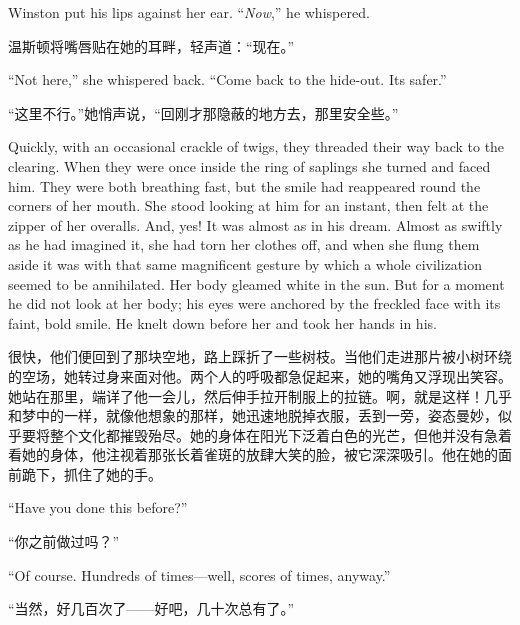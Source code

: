 \begin{paracol}{2}
\switchcolumn*

Winston put his lips against her ear. ``\emph{Now},'' he whispered.

\switchcolumn

温斯顿将嘴唇贴在她的耳畔，轻声道：``现在。''

\switchcolumn*

``Not here,'' she whispered back. ``Come back to the hide-out.
It\textquotesingle s safer.''

\switchcolumn

``这里不行。''她悄声说，``回刚才那隐蔽的地方去，那里安全些。''

\switchcolumn*

Quickly, with an occasional crackle of twigs, they threaded their way
back to the clearing. When they were once inside the ring of saplings
she turned and faced him. They were both breathing fast, but the smile
had reappeared round the corners of her mouth. She stood looking at him
for an instant, then felt at the zipper of her overalls. And, yes! It
was almost as in his dream. Almost as swiftly as he had imagined it, she
had torn her clothes off, and when she flung them aside it was with that
same magnificent gesture by which a whole civilization seemed to be
annihilated. Her body gleamed white in the sun. But for a moment he did
not look at her body; his eyes were anchored by the freckled face with
its faint, bold smile. He knelt down before her and took her hands in
his.

\switchcolumn

很快，他们便回到了那块空地，路上踩折了一些树枝。当他们走进那片被小树环绕的空场，她转过身来面对他。两个人的呼吸都急促起来，她的嘴角又浮现出笑容。她站在那里，端详了他一会儿，然后伸手拉开制服上的拉链。啊，就是这样！几乎和梦中的一样，就像他想象的那样，她迅速地脱掉衣服，丢到一旁，姿态曼妙，似乎要将整个文化都摧毁殆尽。她的身体在阳光下泛着白色的光芒，但他并没有急着看她的身体，他注视着那张长着雀斑的放肆大笑的脸，被它深深吸引。他在她的面前跪下，抓住了她的手。

\switchcolumn*

``Have you done this before?''

\switchcolumn

``你之前做过吗？''

\switchcolumn*

``Of course. Hundreds of times---well, scores of times, anyway.''

\switchcolumn

``当然，好几百次了——好吧，几十次总有了。''


\end{paracol}
